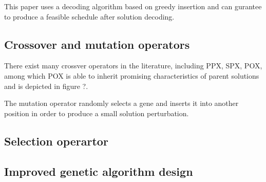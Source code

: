 This paper uses a decoding algorithm based on greedy insertion and can gurantee to produce a feasible schedule after solution decoding.

\subsection{Crossover and mutation operators}
There exist many crossver operators in the literature, including PPX, SPX, POX, among which POX is able to inherit promising characteristics of parent solutions and is depicted in figure ?.

The mutation operator randomly selects a gene and inserts it into another position in order to produce a small solution perturbation.


\subsection{Selection operartor}


\subsection{Improved genetic algorithm design}

